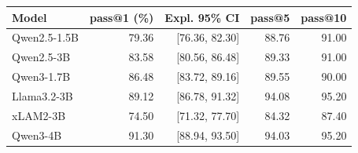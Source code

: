 \begin{tabular}{lrrrr}
\toprule
Model & pass@1 (\%) & Expl. 95\% CI & pass@5 & pass@10 \\
\midrule
Qwen2.5-1.5B & 79.36 & [76.36, 82.30] & 88.76 & 91.00 \\
Qwen2.5-3B & 83.58 & [80.56, 86.48] & 89.33 & 91.00 \\
Qwen3-1.7B & 86.48 & [83.72, 89.16] & 89.55 & 90.00 \\
Llama3.2-3B & 89.12 & [86.78, 91.32] & 94.08 & 95.20 \\
xLAM2-3B & 74.50 & [71.32, 77.70] & 84.32 & 87.40 \\
Qwen3-4B & 91.30 & [88.94, 93.50] & 94.03 & 95.20 \\
\bottomrule
\end{tabular}
